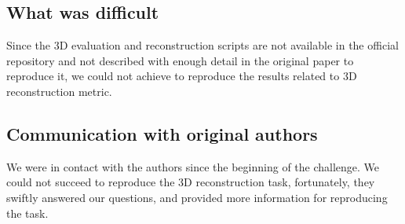 \subsection{What was difficult}

Since the 3D evaluation and reconstruction scripts are not available in the official repository and not described with enough detail in the original paper to reproduce it, we could not achieve to reproduce the results related to 3D reconstruction metric. 

\subsection{Communication with original authors}
We were in contact with the authors since the beginning of the challenge. We could not succeed to reproduce the 3D reconstruction task, fortunately, they swiftly answered our questions, and provided more information for reproducing the task.
